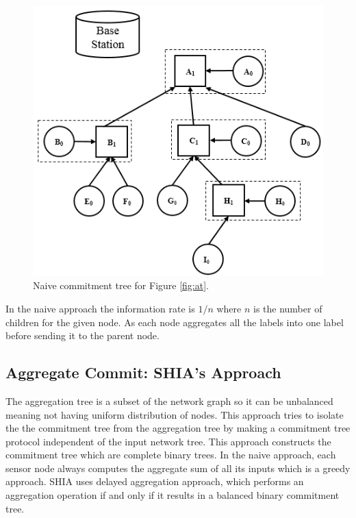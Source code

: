 		\begin{figure}[h!]
			\centering
			\includegraphics[scale = 1]{images/naive-commitment-tree.png}
			\caption{Naive commitment tree for Figure \ref{fig:at}.}
			\label{fig:naive-commitment-tree}
		\end{figure}
		In the naive approach the information rate is $1/n$ where $n$ is the number of children for the given node.
		As each node aggregates all the labels into one label before sending it to the parent node.  
	\subsection{Aggregate Commit: SHIA's Approach} 
		\label{sub:aggregate_commit_improved_approach}
		The aggregation tree is a subset of the network graph so it can be unbalanced meaning not having uniform distribution of nodes.
		This approach tries to isolate the the commitment tree from the aggregation tree by making a commitment tree protocol independent of the input network tree.
		This approach constructs the commitment tree which are complete binary trees.
		In the naive approach, each sensor node always computes the aggregate sum of all its inputs which is a greedy approach.
		SHIA uses delayed aggregation approach, which performs an aggregation operation if and only if it results in a balanced binary commitment tree.

